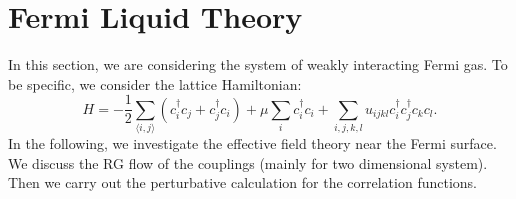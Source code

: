 \section{Fermi Liquid Theory}
In this section, we are considering the system of weakly interacting Fermi gas.
To be specific, we consider the lattice Hamiltonian:
\begin{equation}\label{eq:FL-gen-ham}
	H = -\frac{1}{2}\sum_{\langle i,j \rangle} (c_i^\dagger c_{j} + c_{j}^\dagger c_i) + \mu\sum_i c_i^\dagger c_i + \sum_{i,j,k,l} u_{ijkl} c_i^\dagger c_j^\dagger c_k c_l.
\end{equation}
In the following, we investigate the effective field theory near the Fermi surface.
We discuss the RG flow of the couplings (mainly for two dimensional system).
Then we carry out the perturbative calculation for the correlation functions. 

